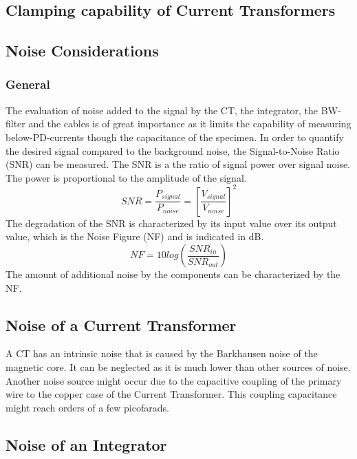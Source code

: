 \subsection{Clamping capability of Current Transformers }

\subsection{Noise Considerations}
\subsubsection{General}
The evaluation of noise added to the signal by the CT, the integrator, the BW-filter and the cables is of great importance as it limits the capability of measuring below-PD-currents though the capacitance of the specimen. 
In order to quantify the desired signal compared to the background noise, the Signal-to-Noise Ratio (SNR) can be measured. The SNR is a the ratio of signal power over signal noise. The power is proportional to the amplitude of the signal.
\begin{equation}
	SNR=\frac{P_{signal}}{P_{noise}} = \left[\frac{V_{signal}}{V_{noise}}\right]^2
\end{equation}
The degradation of the SNR is characterized by its input value over its output value, which is the Noise Figure (NF) and is indicated in dB.
\begin{equation}
	NF = 10log\left(\frac{SNR_{in}}{SNR_{out}}\right)
\end{equation}
The amount of additional noise by the components can be characterized by the NF. 
\subsection{Noise of a Current Transformer}
A CT has an intrinsic noise that is caused by the Barkhausen noise of the magnetic core. It can be neglected as it is much lower than other sources of noise. %
Another noise source might occur due to the capacitive coupling of the primary wire to the copper case of the Current Transformer. This coupling capacitance might reach orders of a few picofarads. %


\subsection{Noise of an Integrator}


